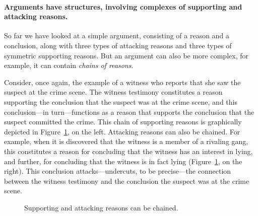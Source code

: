 \documentclass[10pt]{article}
\begin{document}
\paragraph{Arguments have structures, involving complexes of supporting and attacking reasons.} 

So far we have looked at a simple argument,  consisting of a reason and a conclusion, along with three types 
of attacking reasons and three types of symmetric supporting reasons. But an argument can also be more complex, 
for example, it can contain \textit{chains of reasons}. 

Consider, once again, the example of a witness who reports that she saw the suspect at the crime scene. The witness testimony constitutes a 
reason supporting the conclusion that the suspect was at the crime scene, and this conclusion---in turn---functions as a reason 
that supports the conclusion that the suspect committed the crime. This chain of supporting reasons 
is graphically depicted in Figure~\ref{fig:arg2}, on the left. 
Attacking reasons can also be chained. For example, when it is discovered that the witness is a member of a rivaling gang, 
this constitutes a reason for concluding that the witness has an interest in lying, and further, for concluding 
that the witness is in fact lying (Figure~\ref{fig:arg2}, on the right). This conclusion attacks---undercuts, to be precise---the connection 
between the witness testimony and the conclusion the suspect was at the crime scene.

\begin{figure}[bt]
\centering

\caption{Supporting and attacking reasons can be chained. \label{fig:arg2}}
\end{figure}
\end{document}
